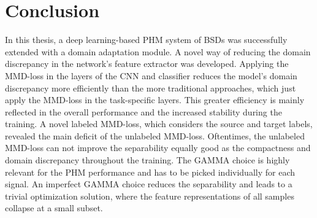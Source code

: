 \chapter{Conclusion}\label{chapter:conclusion}
In this thesis, a deep learning-based PHM system of BSDs was successfully extended with a domain adaptation module. A novel way of reducing the domain discrepancy in the network's feature extractor was developed. Applying the MMD-loss in the layers of the CNN and classifier reduces the model's domain discrepancy more efficiently than the more traditional approaches, which just apply the MMD-loss in the task-specific layers. This greater efficiency is mainly reflected in the overall performance and the increased stability during the training. A novel labeled MMD-loss, which considers the source and target labels, revealed the main deficit of the unlabeled MMD-loss. Oftentimes, the unlabeled MMD-loss can not improve the separability equally good as the compactness and domain discrepancy throughout the training. The GAMMA choice is highly relevant for the PHM performance and has to be picked individually for each signal. An imperfect GAMMA choice reduces the separability and leads to a trivial optimization solution, where the feature representations of all samples collapse at a small subset. 
